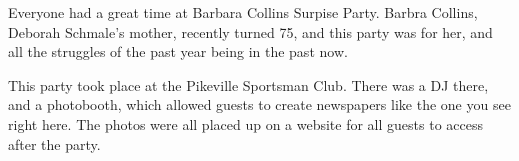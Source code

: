 \documentclass[letterpaper]{article}
\date{\today}
\begin{document}
\maketitle
{}

\begin{multicols}{3}
    Everyone had a great time at Barbara Collins Surpise Party. Barbra
    Collins, Deborah Schmale's mother, recently turned 75, and this party
    was for her, and all the struggles of the past year being in the past
    now.
    
    This party
    took place at the Pikeville Sportsman Club. There was a DJ there, and a
    photobooth, which allowed guests to create newspapers like the one you
    see right here. The photos were all placed up on a website for all
    guests to access after the party.
    
\closearticle

\end{multicols}
\end{document}
